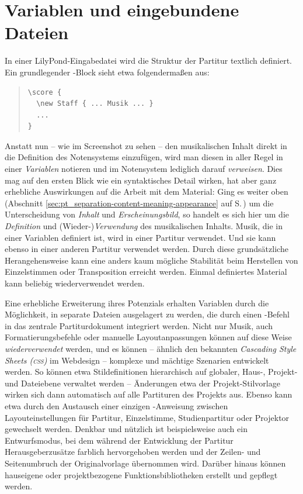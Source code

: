 \documentclass[DIV=12]{scrreprt}
\begin{document}
\section{Variablen und eingebundene Dateien}
\label{sec:pt_variables-includes}
In einer LilyPond-Eingabedatei wird die Struktur der Partitur textlich definiert.
Ein grundlegender -Block sieht etwa folgendermaßen aus:

\begin{quote}
\begin{minipage}{\textwidth}
\begin{verbatim}
\score {
  \new Staff { ... Musik ... }
  ...
}
\end{verbatim}
\end{minipage}
\end{quote}

Anstatt nun -- wie im Screenshot zu sehen -- den musikalischen Inhalt direkt in die Definition des Notensystems einzufügen, wird man diesen in aller Regel in einer \emph{Variablen} notieren und im Notensystem lediglich darauf \emph{verweisen}.
Dies mag auf den ersten Blick wie ein syntaktisches Detail wirken, hat aber ganz erhebliche Auswirkungen auf die Arbeit mit dem Material:
Ging es weiter oben (Abschnitt \ref{sec:pt_separation-content-meaning-appearance} auf S.\,\pageref{sec:pt_separation-content-meaning-appearance}) um die Unterscheidung von \emph{Inhalt} und \emph{Erscheinungsbild}, so handelt es sich hier um die \emph{Definition} und (Wieder-)\emph{Verwendung} des musikalischen Inhalts.
Musik, die in einer Variablen definiert ist, wird in einer Partitur verwendet.
Und sie kann ebenso in einer anderen Partitur verwendet werden.
Durch diese grundsätzliche Herangehensweise kann eine anders kaum mögliche Stabilität beim Herstellen von Einzelstimmen oder Transposition erreicht werden.
Einmal definiertes Material kann beliebig wiederverwendet werden.

\medskip
Eine erhebliche Erweiterung ihres Potenzials erhalten Variablen durch die Möglichkeit, in separate Dateien ausgelagert zu werden, die durch einen -Befehl in das zentrale Partiturdokument integriert werden.
Nicht nur Musik, auch Formatierungsbefehle oder manuelle Layoutanpassungen können auf diese Weise \emph{wiederverwendet} werden, und es können -- ähnlich den bekannten \emph{Cascading Style Sheets (\textsc{css})} im Webdesign -- komplexe und mächtige Szenarien entwickelt werden.
So können etwa Stildefinitionen hierarchisch auf globaler, Haus-, Projekt- und Dateiebene verwaltet werden -- Änderungen etwa der Projekt-Stilvorlage wirken sich dann automatisch auf alle Partituren des Projekts aus.
Ebenso kann etwa durch den Austausch einer einzigen -Anweisung zwischen Layouteinstellungen für Partitur, Einzelstimme, Studienpartitur oder Projektor gewechselt werden.
Denkbar und nützlich ist beispielsweise auch ein Entwurfsmodus, bei dem während der Entwicklung der Partitur Herausgeberzusätze farblich hervorgehoben werden und der Zeilen- und Seitenumbruch der Originalvorlage übernommen wird.
Darüber hinaus können hauseigene oder projektbezogene Funktionsbibliotheken erstellt und gepflegt werden.
\end{document}
